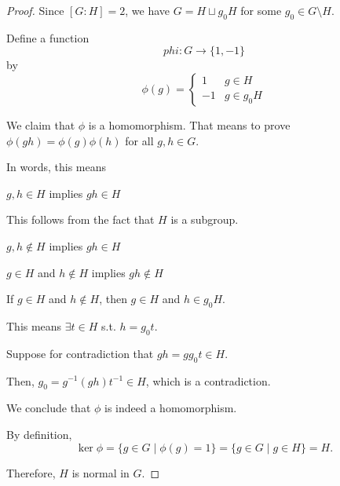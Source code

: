 \begin{proof}
    Since $[G:H] = 2$, we have $G = H \sqcup g_0H$ for some $g_0 \in G \setminus H$.

    Define a function \[ phi: G \to \{ 1, -1 \} \] by \[
        \phi(g) = \begin{cases}
            1  & g \in H    \\
            -1 & g \in g_0H
        \end{cases}
    \]

    We claim that $\phi$ is a homomorphism. That means to prove $\phi(gh) = \phi(g)\phi(h)$ for all $g, h \in G$.

    In words, this means
    \begin{listu}
        \item $g, h \in H$ implies $gh \in H$

        This follows from the fact that $H$ is a subgroup.

        \item $g, h \notin H$ implies $gh \in H$


        \item $g \in H$ and $h \notin H$ implies $gh \notin H$

        If $g \in H$ and $h \notin H$, then $g \in H$ and $h \in g_0 H$.

        This means $\exists t \in H$ s.t. $h = g_0t$.

        Suppose for contradiction that $gh = g g_0 t \in H$.

        Then, $g_0 = g^{-1} (gh) t^{-1} \in H$, which is a contradiction.
    \end{listu}

    We conclude that $\phi$ is indeed a homomorphism.

    By definition, \[
        \ker{\phi} = \{ g \in G \mid \phi(g) = 1 \} = \{ g \in G \mid g \in H \} = H.
    \]

    Therefore, $H$ is normal in $G$.
\end{proof}

